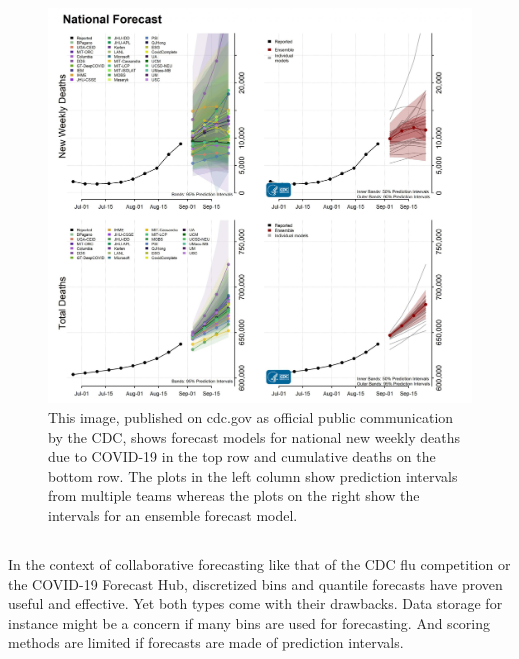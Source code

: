 \documentclass[11pt,notitlepage]{isuthesis}
\begin{document}
\begin{figure}[htbp]
\centerline{\includegraphics[scale=.12]{Images/8_30_21_cvd_deaths.jpeg}}
\caption[Official CDC COVID-19 deaths report August 2021]{This image, 
published on cdc.gov as official public communication 
by the CDC, shows forecast models for national new weekly deaths due to COVID-19 
in the top row and cumulative deaths on the bottom row. The plots in the left 
column show prediction intervals from multiple teams whereas the plots on the 
right show the intervals for an ensemble forecast model.}
\label{fig:cdcoff}
\end{figure}

\subsection{}
In the context of collaborative forecasting like that of the CDC flu competition
or the COVID-19 Forecast Hub, discretized bins and quantile forecasts have 
proven useful and effective. Yet both types come with their drawbacks. Data 
storage for instance might be a concern if many bins are used for forecasting. 
And scoring methods are limited if forecasts are made of prediction intervals.
\end{document}
